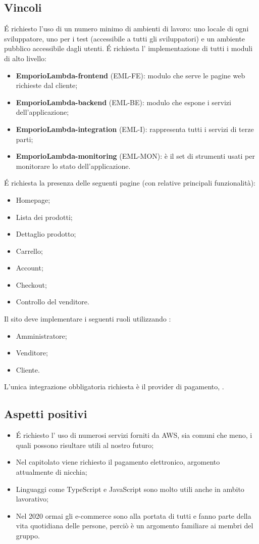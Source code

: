 \subsection{Vincoli}
\'E richiesto l'uso di un numero minimo di ambienti di lavoro: uno locale di ogni sviluppatore, uno per i test (accessibile a tutti gli sviluppatori) e un ambiente pubblico accessibile dagli utenti.
\'E richiesta l' implementazione di tutti i moduli di alto livello:
\begin{itemize}
\item	\textbf{EmporioLambda-frontend} (EML-FE): modulo che serve le pagine web richieste dal cliente;
\item	\textbf{EmporioLambda-backend} (EML-BE): modulo che espone i servizi dell'applicazione;
\item	\textbf{EmporioLambda-integration} (EML-I): rappresenta tutti i servizi di terze parti;
\item	\textbf{EmporioLambda-monitoring} (EML-MON): è il set di strumenti usati per monitorare lo stato dell'applicazione.
\end{itemize}
\'E richiesta la presenza delle seguenti pagine (con relative principali funzionalità):
\begin{itemize}
\item	Homepage;
\item	Lista dei prodotti;
\item	Dettaglio prodotto;
\item	Carrello;
\item	Account;
\item	Checkout;
\item	Controllo del venditore.
\end{itemize}
Il sito deve implementare i seguenti ruoli utilizzando :
\begin{itemize}
\item	Amministratore;
\item	Venditore;
\item	Cliente.
\end{itemize}
L'unica integrazione obbligatoria richiesta è il provider di pagamento, .
\subsection{Aspetti positivi}
\begin{itemize}
\item	\'E richiesto l' uso di numerosi servizi forniti da AWS, sia comuni che meno, i quali possono risultare utili al nostro futuro;
\item	Nel capitolato viene richiesto il pagamento elettronico, argomento attualmente di nicchia;
\item	Linguaggi come TypeScript e JavaScript sono molto utili anche in ambito lavorativo;
\item	Nel 2020 ormai gli e-commerce sono alla portata di tutti e fanno parte della vita quotidiana delle persone, perciò è un argomento familiare ai membri del gruppo.
\end{itemize}
